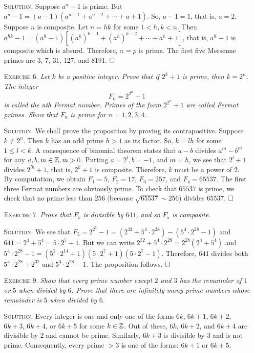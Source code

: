 \documentclass[11pt, leqno]{article}
\newcommand{\done}{\ensuremath{\hfill\square}}
\begin{document}
\textsc{Solution}. Suppose $a^n-1$ is prime. But $a^n-1 = (a-1)(a^{n-1} + a^{n-2} + \cdots + a + 1)$. So, $a-1 = 1$, that is, $a=2$. Suppose $n$ is composite. Let $n = hk$ for some $1 < h, k < n$. Then $a^{hk}-1 = (a^h-1)[(a^h)^{k-1} + (a^h)^{k-2} + \cdots + a^h + 1]$, that is, $a^h-1$ is composite which is absurd. Therefore, $n = p$ is prime. The first five Mersenne primes are $3$, $7$, $31$, $127$, and $8191$. \done

\textsc{Exercise 6}. \emph{Let $k$ be a positive integer. Prove that if $2^k+1$ is prime, then $k= 2^n$. The integer 
\begin{displaymath}
F_n = 2^{2^n} + 1
\end{displaymath}
is called the nth Fermat number. Primes of the form $2^{2^n}+1$ are called Fermat primes. Show that $F_n$ is prime for $n=1,2,3,4$.}

\textsc{Solution}. We shall prove the proposition by proving its contrapositive. Suppose $k \ne 2^n$. Then $k$ has an odd prime $h>1$ as its factor. So, $k = lh$ for some $1\leq l < k$. A consequence of binomial theorem states that $a-b$ divides $a^m-b^m$ for any $a, b, m\in\mathbb{Z}, m>0$. Putting $a = 2^l, b = -1$, and $m = h$, we see that $2^l+1$ divides $2^{lh}+1$, that is, $2^k+1$ is composite. Therefore, $k$ must be a power of $2$. By computation, we obtain $F_1 = 5$, $F_2 = 17$, $F_3 = 257$, and $F_4 = 65537$. The first three Fermat numbers are obviously prime. To check that $65537$ is prime, we check that no prime less than $256$ (because $\sqrt{65537} \sim 256$) divides $65537$. \done

\textsc{Exercise 7}. \emph{Prove that $F_5$ is divisible by $641$, and so $F_5$ is composite.}

\textsc{Solution.} We see that $F_5 = 2^{2^5} - 1 = (2^{32} + 5^4\cdot 2^{28}) - (5^4\cdot 2^{28} - 1)$ and $641 = 2^4 + 5^4 = 5\cdot 2^7 + 1$. But we can write $2^{32} + 5^4\cdot 2^{28} = 2^{28}(2^4 + 5^4)$ and $5^4\cdot 2^{28} - 1 = (5^2\cdot 2^{14} + 1)(5\cdot 2^7 + 1)(5\cdot 2^7 - 1)$. Therefore, $641$ divides both $5^4\cdot 2^{28} + 2^{32}$ and $5^4\cdot 2^{28} - 1$. The proposition follows. \done

\textsc{Exercise 9}. \emph{Show that every prime number except $2$ and $3$ has the remainder of $1$ or $5$ when divided by $6$. Prove that there are infinitely many prime numbers whose remainder is $5$ when divided by $6$.}

\textsc{Solution}. Every integer is one and only one of the forms $6k$, $6k+1$, $6k+2$, $6k+3$, $6k+4$, or $6k+5$ for some $k\in\mathbb{Z}$. Out of these, $6k$, $6k+2$, and $6k+4$ are divisible by $2$ and cannot be prime. Similarly, $6k+3$ is divisible by $3$ and is not prime. Consequently, every prime $>3$ is one of the forms: $6k+1$ or $6k+5$.
\end{document}
